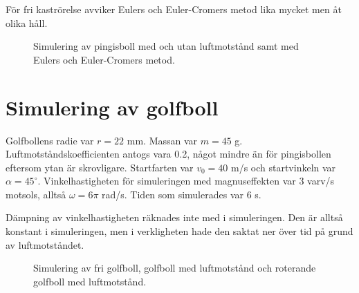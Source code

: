 \documentclass[12pt, a4paper]{article}
\begin{document}
För fri kaströrelse avviker Eulers och Euler-Cromers metod lika mycket men åt olika håll.

\begin{figure}[ht]
    \centering
    
    \caption{Simulering av pingisboll med och utan luftmotstånd samt med Eulers och Euler-Cromers metod.}
    \label{fig:pingisboll}
\end{figure}

\section{Simulering av golfboll}
Golfbollens radie var $r=22$ mm. Massan var $m=45$ g. Luftmotstånds\-koefficienten antogs vara 0.2, något mindre än för pingisbollen eftersom ytan är skrovligare. Startfarten var $v_0=40$ m/s och startvinkeln var $\alpha=45^\circ$. Vinkelhastigheten för simuleringen med magnuseffekten var 3 varv/s motsols, alltså $\omega=6\pi$ rad/s. Tiden som simulerades var 6 s.

Dämpning av vinkelhastigheten räknades inte med i simuleringen. Den är alltså konstant i simuleringen, men i verkligheten hade den saktat ner över tid på grund av luftmotståndet.

\begin{figure}[ht]
    \centering
    
    \caption{Simulering av fri golfboll, golfboll med luftmotstånd och roterande golfboll med luftmotstånd.}
    \label{fig:golfboll}
\end{figure}

\printbibliography
\end{document}
